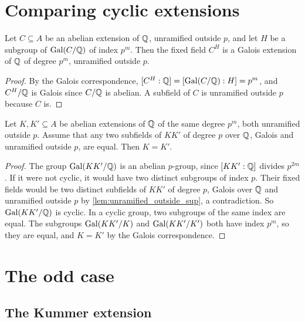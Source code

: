 \section{Comparing cyclic extensions}

\begin{lemma}
  \label{lem:kw_fixedField_index}
  \leanok
  Let $C \subseteq A$ be an abelian extension of $\mathbb{Q}$, unramified outside $p$, and let $H$ be a
  subgroup of $\mathrm{Gal}(C/\mathbb{Q})$ of index $p^m$. Then the fixed field $C^{H}$ is a Galois extension of
  $\mathbb{Q}$ of degree $p^m$, unramified outside $p$.
\end{lemma}

\begin{proof}
  \leanok
  By the Galois correspondence, $[C^{H} : \mathbb{Q}] = [\mathrm{Gal}(C/\mathbb{Q}) : H] = p^m$, and $C^{H}/\mathbb{Q}$ is
  Galois since $C/\mathbb{Q}$ is abelian. A subfield of $C$ is unramified outside $p$ because $C$ is.
\end{proof}

\begin{lemma}
  \label{lem:kw_eq_of_unique_prime_subfield}
  \leanok
  Let $K, K' \subseteq A$ be abelian extensions of $\mathbb{Q}$ of the same degree $p^m$, both unramified
  outside $p$. Assume that any two subfields of $KK'$ of degree $p$ over $\mathbb{Q}$, Galois and
  unramified outside $p$, are equal. Then $K = K'$.
\end{lemma}

\begin{proof}
  \leanok
  The group $\mathrm{Gal}(KK'/\mathbb{Q})$ is an abelian $p$-group, since $[KK':\mathbb{Q}]$ divides $p^{2m}$. If it
  were not cyclic, it would have two distinct subgroups of index $p$. Their fixed fields would be
  two distinct subfields of $KK'$ of degree $p$, Galois over $\mathbb{Q}$ and unramified outside $p$ by
  \ref{lem:unramified_outside_sup}, a contradiction. So $\mathrm{Gal}(KK'/\mathbb{Q})$ is cyclic. In a cyclic
  group, two subgroups of the same index are equal. The subgroups $\mathrm{Gal}(KK'/K)$ and
  $\mathrm{Gal}(KK'/K')$ both have index $p^m$, so they are equal, and $K = K'$ by the Galois
  correspondence.
\end{proof}

\section{The odd case}

\subsection{The Kummer extension}

